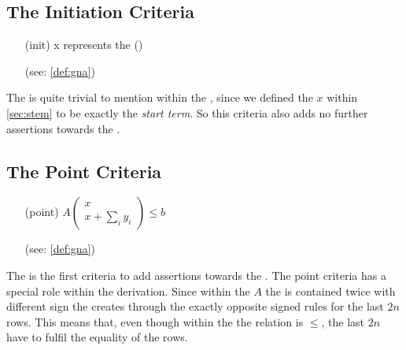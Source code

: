 \subsection{The Initiation Criteria}
\begin{itemize}
	\setlength{\itemindent}{1in}
	\item[(init)] x represents the \startterm (\stem)
	\item[] (see: \autoref{def:gna})
\end{itemize}

The \initc is quite trivial to mention within the \solver, since we defined the \stem $x$ within \autoref{sec:stem} to be exactly the  \textit{start term}.\newline
So this criteria also adds no further assertions towards the \solver.

\subsection{The Point Criteria}
\label{sec:point-criteria}
\begin{itemize}
	\setlength{\itemindent}{1in}
	\item[(point)] $A\begin{pmatrix} x \\ x + \sum_i y_i \end{pmatrix} \le b$
	\item[] (see: \autoref{def:gna})
\end{itemize}

The \pointc is the first criteria to add assertions towards the \solver.\newline
The point criteria has a special role within the derivation. Since within the \iterationmatrix $A$ the \updatematrix is contained twice with different sign the \iterationmatrix creates through the \pointc exactly opposite signed rules for the last $2n$ rows.
This means that, even though within the \pointc the relation is $\le$, the last $2n$ have to fulfil the equality of the rows.\newline

